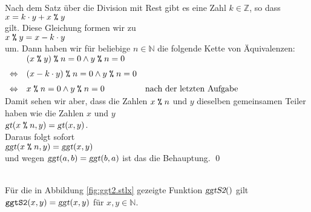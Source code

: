 \proof
Nach dem Satz \"{u}ber die Division mit Rest gibt es eine Zahl $k \in \mathbb{Z}$, so dass
\\[0.2cm]
\hspace*{1.3cm}
$x = k \cdot y + x \;\texttt{\%}\; y$
\\[0.2cm]
gilt.  Diese Gleichung formen wir zu
\\[0.2cm]
\hspace*{1.3cm}
$x \;\texttt{\%}\; y = x - k \cdot y$
\\[0.2cm]
um.  Dann haben wir f\"{u}r beliebige $n \in \mathbb{N}$ die folgende Kette von \"{A}quivalenzen:
\\[0.2cm]
\hspace*{1.3cm}
$
\begin{array}[t]{lll}
                & (x \;\texttt{\%}\; y)   \;\texttt{\%}\; n = 0 \wedge y \;\texttt{\%}\; n = 0   \\[0.2cm]
\Leftrightarrow & (x - k \cdot y) \;\texttt{\%}\; n = 0 \wedge y \;\texttt{\%}\; n = 0   \\[0.2cm]
\Leftrightarrow & x \;\texttt{\%}\; n = 0 \wedge y \;\texttt{\%}\; n = 0               &
                  \mbox{nach der letzten Aufgabe}                        
\end{array}
$
\\[0.2cm]
Damit sehen wir aber, dass die Zahlen $x \;\texttt{\%}\; n$ und $y$ dieselben gemeinsamen Teiler haben wie
die Zahlen $x$ und $y$
\\[0.2cm]
\hspace*{1.3cm}
$\textsl{gt}(x \;\texttt{\%}\; n, y) = \textsl{gt}(x,y)$.
\\[0.2cm]
Daraus folgt sofort
\\[0.2cm]
\hspace*{1.3cm}
$\textsl{ggt}(x \;\texttt{\%}\; n, y) = \textsl{ggt}(x,y)$
\\[0.2cm]
und wegen $\textsl{ggt}(a,b) = \textsl{ggt}(b,a)$ ist das die Behauptung. \qed

\begin{Satz} \hspace*{\fill} \\
F\"{u}r die in Abbildung \ref{fig:ggt2.stlx} gezeigte Funktion $\textsl{ggtS2}()$ gilt
\\[0.2cm]
\hspace*{1.3cm}
$\texttt{ggtS2}(x,y) = \textsl{ggt}(x,y)$ \quad f\"{u}r $x,y \in \mathbb{N}$.
\end{Satz}

